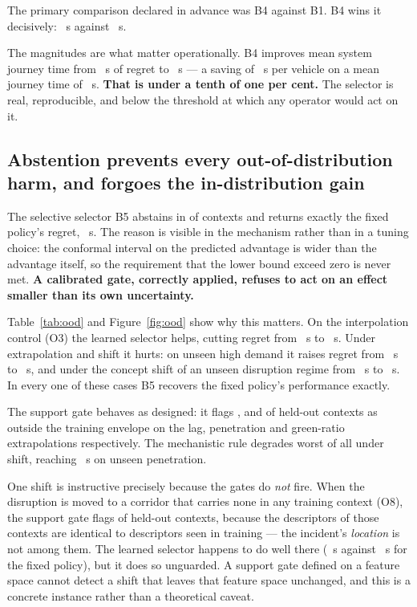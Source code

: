 The primary comparison declared in advance was B4 against B1. B4 wins it
decisively: \NumBFourRegret~s against \NumBOneRegret~s.

The magnitudes are what matter operationally. B4 improves mean system journey
time from \NumBZeroRegret~s of regret to \NumBFourRegret~s --- a saving of
\NumBFourVsBZero~s per vehicle on a mean journey time of
\NumFixedCostPThree~s. \textbf{That is under a tenth of one per cent.} The
selector is real, reproducible, and below the threshold at which any operator
would act on it.

\subsection{Abstention prevents every out-of-distribution harm, and forgoes the
in-distribution gain}

The selective selector B5 abstains in \NumAbstainRate{} of contexts and returns
exactly the fixed policy's regret, \NumBFiveRegret~s. The reason is visible in
the mechanism rather than in a tuning choice: the conformal interval on the
predicted advantage is wider than the advantage itself, so the requirement that
the lower bound exceed zero is never met. \textbf{A calibrated gate, correctly
applied, refuses to act on an effect smaller than its own uncertainty.}

Table~\ref{tab:ood} and Figure~\ref{fig:ood} show why this matters. On the
interpolation control (O3) the learned selector helps, cutting regret from
\NumOODThreeMidBZero~s to \NumOODThreeMidBFour~s. Under extrapolation and shift
it hurts: on unseen high demand it raises regret from
\NumOODOneHighBZero~s to \NumOODOneHighBFour~s, and under the concept shift of
an unseen disruption regime from \NumOODSevenIncBZero~s to
\NumOODSevenIncBFour~s. In every one of these cases B5 recovers the fixed
policy's performance exactly.

The support gate behaves as designed: it flags \NumOODFourLagSupport{},
\NumOODFivePenSupport{} and \NumOODSixGreenSupport{} of held-out contexts as
outside the training envelope on the lag, penetration and green-ratio
extrapolations respectively. The mechanistic rule degrades worst of all under
shift, reaching \NumOODFivePenBOne~s on unseen penetration.

One shift is instructive precisely because the gates do \emph{not} fire. When
the disruption is moved to a corridor that carries none in any training context
(O8), the support gate flags \NumOODEightNorthSupport{} of held-out contexts,
because the descriptors of those contexts are identical to descriptors seen in
training --- the incident's \emph{location} is not among them. The learned
selector happens to do well there (\NumOODEightNorthBFour~s against
\NumOODEightNorthBZero~s for the fixed policy), but it does so unguarded. A
support gate defined on a feature space cannot detect a shift that leaves that
feature space unchanged, and this is a concrete instance rather than a
theoretical caveat.

